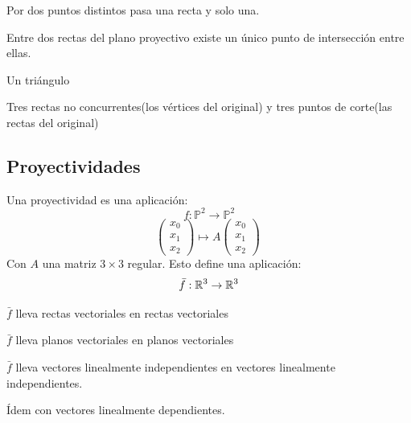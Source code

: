 \begin{nth}
	Por dos puntos distintos pasa una recta y solo una.
\end{nth}

\begin{nth}
	Entre dos rectas del plano proyectivo existe un único punto de intersección entre ellas.
\end{nth}

\begin{ejemplo}
	Un triángulo
\end{ejemplo}
\begin{ndef}
	Tres rectas no concurrentes(los vértices del original) y tres puntos de corte(las rectas del original)
\end{ndef}

\subsection{Proyectividades}

\begin{ndef}[Proyectividad]
	Una proyectividad es una aplicación:
	\[
	f: \mathbb P ^2 \to \mathbb P^2
	\]
	\[
	 \begin{pmatrix}
 x_0\\
 x_1\\
 x_2
\end{pmatrix}  \mapsto A  \begin{pmatrix}
 x_0\\
 x_1\\
 x_2
\end{pmatrix}  \
	\]
	Con $A$ una matriz $3\times 3$ regular. Esto define una aplicación:
	\[
	\bar{f} : \mathbb{R}^3 \to \mathbb{R}^3
	\]

\end{ndef}

\begin{nprop}[Propiedades de $\bar{f}$]\hfill
	\begin{nlist}
	\item $\bar{f}$ lleva rectas vectoriales en rectas vectoriales
	\item $\bar{f}$ lleva planos vectoriales en planos vectoriales
	\item $\bar{f}$ lleva vectores linealmente independientes en vectores linealmente independientes.
	\item Ídem con vectores linealmente dependientes.
\end{nlist}
\end{nprop}

